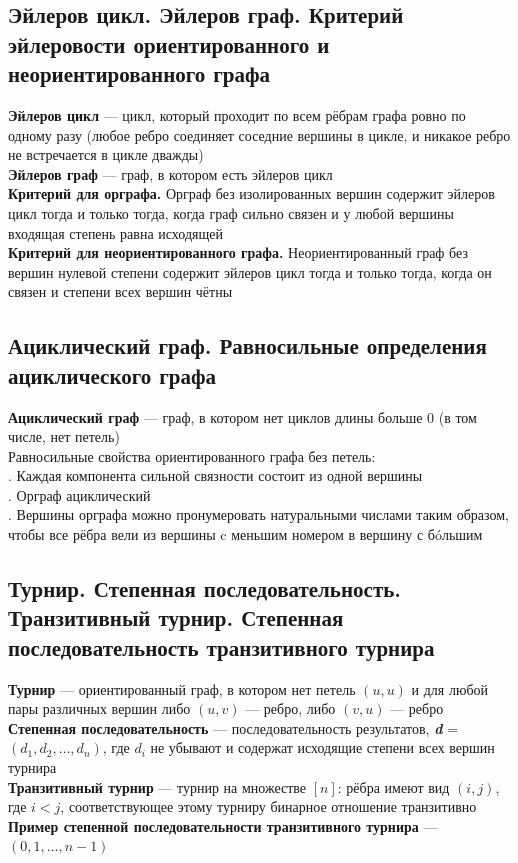 \documentclass[a4paper]{article}
\begin{document}
\subsection{Эйлеров цикл. Эйлеров граф. Критерий эйлеровости ориентированного и неориентированного графа}
\textbf{Эйлеров цикл} — цикл, который проходит по всем рёбрам графа ровно по одному разу (любое ребро соединяет соседние вершины в цикле, и никакое ребро не встречается в цикле дважды)\\[2mm]
\indent\textbf{Эйлеров граф} — граф, в котором есть эйлеров цикл\\[2mm]
\indent\textbf{Критерий для орграфа.} Орграф без изолированных вершин содержит эйлеров цикл тогда и только тогда, когда граф сильно связен и у любой вершины входящая степень равна исходящей\\[2mm]
\indent\textbf{Критерий для неориентированного графа.} Неориентированный граф без вершин нулевой степени содержит эйлеров цикл тогда и только тогда, когда он связен и степени всех вершин чётны

\subsection{Ациклический граф. Равносильные определения ациклического графа}
\textbf{Ациклический граф} — граф, в котором нет циклов длины больше 0 (в том числе, нет петель)\\[2mm]
Равносильные свойства ориентированного графа без петель:\\[2mm]
. Каждая компонента сильной связности состоит из одной вершины\\[2mm]
. Орграф ациклический\\[2mm]
. Вершины орграфа можно пронумеровать натуральными числами таким образом, чтобы все рёбра вели из вершины c меньшим номером в вершину с б\'oльшим 

\subsection{Турнир. Степенная последовательность. Транзитивный турнир. Степенная последовательность транзитивного турнира}
\textbf{Турнир} — ориентированный граф, в котором нет петель $(u,u)$ и для любой пары различных вершин либо $(u,v)$ — ребро, либо $(v,u)$ — ребро\\[2mm]
\indent\textbf{Степенная последовательность} — последовательность результатов, \textbf{\textit{d}} = $(d_1,d_2,\ldots,d_n)$, где $d_i$ не убывают и содержат исходящие степени всех вершин турнира\\[2mm]
\indent\textbf{Транзитивный турнир} — турнир на множестве $[n]$: рёбра имеют вид $(i, j)$, где $i < j$, соответствующее этому турниру бинарное отношение транзитивно\\[2mm]
\indent\textbf{Пример степенной последовательности транзитивного турнира} — $(0, 1,\ldots, n-1)$
\end{document}

